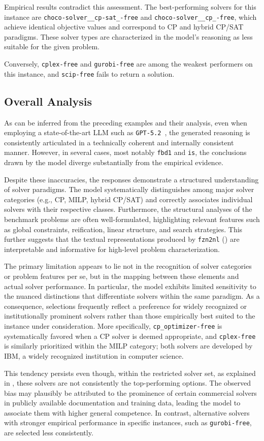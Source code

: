 \documentclass[../../main]{subfiles}
\begin{document}
Empirical results contradict this assessment. The best-performing solvers for this instance are \texttt{choco-solver\_\_cp-sat\_-free} and \texttt{choco-solver\_\_cp\_-free}, which achieve identical objective values and correspond to CP and hybrid CP/SAT paradigms. These solver types are characterized in the model's reasoning as less suitable for the given problem. 

Conversely, \texttt{cplex-free} and \texttt{gurobi-free} are among the weakest performers on this instance, and \texttt{scip-free} fails to return a solution.

\subsection{Overall Analysis}
As can be inferred from the preceding examples and their analysis, even when employing a state-of-the-art LLM such as \texttt{GPT-5.2}~\cite{gpt52}, the generated reasoning is consistently articulated in a technically coherent and internally consistent manner. However, in several cases, most notably \texttt{fbd1} and \texttt{is}, the conclusions drawn by the model diverge substantially from the empirical evidence.

Despite these inaccuracies, the responses demonstrate a structured understanding of solver paradigms. The model systematically distinguishes among major solver categories (e.g., CP, MILP, hybrid CP/SAT) and correctly associates individual solvers with their respective classes. Furthermore, the structural analyses of the benchmark problems are often well-formulated, highlighting relevant features such as global constraints, reification, linear structure, and search strategies. This further suggests that the textual representations produced by \texttt{fzn2nl} () are interpretable and informative for high-level problem characterization.

The primary limitation appears to lie not in the recognition of solver categories or problem features per se, but in the mapping between these elements and actual solver performance. In particular, the model exhibits limited sensitivity to the nuanced distinctions that differentiate solvers within the same paradigm. As a consequence, selections frequently reflect a preference for widely recognized or institutionally prominent solvers rather than those empirically best suited to the instance under consideration. More specifically, \texttt{cp\_optimizer-free} is systematically favored when a CP solver is deemed appropriate, and \texttt{cplex-free} is similarly prioritized within the MILP category; both solvers are developed by IBM, a widely recognized institution in computer science.

This tendency persists even though, within the restricted solver set, as explained in , these solvers are not consistently the top-performing options. The observed bias may plausibly be attributed to the prominence of certain commercial solvers in publicly available documentation and training data, leading the model to associate them with higher general competence. In contrast, alternative solvers with stronger empirical performance in specific instances, such as \texttt{gurobi-free}, are selected less consistently.
\end{document}
